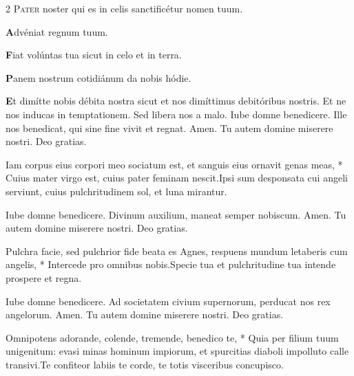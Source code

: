\begin{multicols}{2}
\lettrine[lines=2]{\zallmancaps \color{Red} P}{ater} noster qui es in celis sanctificétur nomen tuum.
\begingroup
\setlength{\parindent}{.25em}
\par {\bfseries \color{Blue} A}dvéniat regnum tuum.
\par {\bfseries \color{Red} F}iat volúntas tua sicut in celo et in terra.
\par {\bfseries \color{Blue} P}anem nostrum cotidiánum da nobis hódie.
\par {\bfseries \color{Red} E}t dimítte nobis débita nostra sicut et nos dimíttimus debitóribus nostris.
\aftergroup\clearparshape%
\endgroup
\newline {} Et ne nos inducas in temptationem. \R Sed libera nos a malo.
\newline {} Iube domne benedicere.
\newline {} Ille nos benedicat, qui sine fine vivit et regnat. \R Amen.
\newline {} Tu autem domine miserere nostri. \R Deo gratias.
\begin{responsory}
{Iam corpus eius corpori meo sociatum est, et sanguis eius ornavit genas meas, * Cuius mater virgo est, cuius pater feminam nescit.}{Ipsi sum desponsata cui angeli serviunt, cuius pulchritudinem sol, et luna mirantur.}
\end{responsory}%
\newline {} Iube domne benedicere.
\newline {} Divinum auxilium, maneat semper nobiscum. \R Amen.
\newline {} Tu autem domine miserere nostri. \R Deo gratias.
\begin{responsory}
{Pulchra facie, sed pulchrior fide beata es Agnes, respuens mundum letaberis cum angelis, * Intercede pro omnibus nobis.}{Specie tua et pulchritudine tua intende prospere et regna.}%
\end{responsory}%
\newline {} Iube domne benedicere.
\newline {} Ad societatem civium supernorum, perducat nos rex angelorum. \R Amen.
\newline {} Tu autem domine miserere nostri. \R Deo gratias.
\begin{responsory-doxology}
{Omnipotens adorande, colende, tremende, benedico te, * Quia per filium tuum unigenitum: evasi minas hominum impiorum, et spurcitias diaboli impolluto calle transivi.}{Te confiteor labiis te corde, te totis visceribus concupisco.}

\end{responsory-doxology}
\end{multicols}

